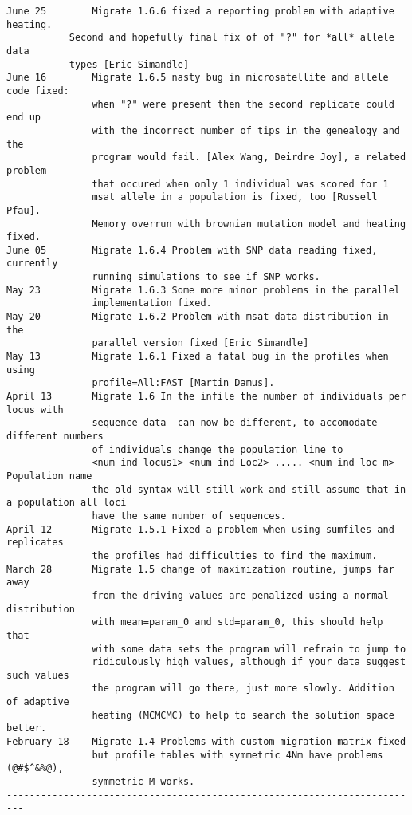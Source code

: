 \begin{small}
\begin{verbatim}
June 25        Migrate 1.6.6 fixed a reporting problem with adaptive heating.
	       Second and hopefully final fix of of "?" for *all* allele data 
	       types [Eric Simandle]  
June 16        Migrate 1.6.5 nasty bug in microsatellite and allele code fixed:
               when "?" were present then the second replicate could end up 
               with the incorrect number of tips in the genealogy and the 
               program would fail. [Alex Wang, Deirdre Joy], a related problem
               that occured when only 1 individual was scored for 1 
               msat allele in a population is fixed, too [Russell Pfau]. 
               Memory overrun with brownian mutation model and heating fixed.
June 05        Migrate 1.6.4 Problem with SNP data reading fixed, currently
               running simulations to see if SNP works. 
May 23         Migrate 1.6.3 Some more minor problems in the parallel 
               implementation fixed.
May 20         Migrate 1.6.2 Problem with msat data distribution in the
               parallel version fixed [Eric Simandle]
May 13         Migrate 1.6.1 Fixed a fatal bug in the profiles when using
               profile=All:FAST [Martin Damus].
April 13       Migrate 1.6 In the infile the number of individuals per locus with 
               sequence data  can now be different, to accomodate different numbers
               of individuals change the population line to
               <num ind locus1> <num ind Loc2> ..... <num ind loc m> Population name
               the old syntax will still work and still assume that in a population all loci
               have the same number of sequences.  
April 12       Migrate 1.5.1 Fixed a problem when using sumfiles and replicates
               the profiles had difficulties to find the maximum.
March 28       Migrate 1.5 change of maximization routine, jumps far away
               from the driving values are penalized using a normal distribution
               with mean=param_0 and std=param_0, this should help that 
               with some data sets the program will refrain to jump to
               ridiculously high values, although if your data suggest such values
               the program will go there, just more slowly. Addition of adaptive
               heating (MCMCMC) to help to search the solution space better.
February 18    Migrate-1.4 Problems with custom migration matrix fixed
               but profile tables with symmetric 4Nm have problems (@#$^&%@),
               symmetric M works.
-------------------------------------------------------------------------

\end{verbatim}
\end{small}
